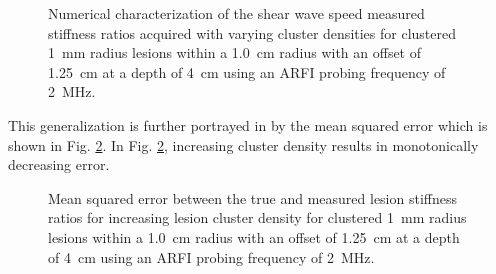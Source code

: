 			\begin{figure}[!htb]
				\centering
				\caption[Numerical characterization of shear wave speed measured stiffness ratio with clustered lesions]{Numerical characterization of the shear wave speed measured stiffness ratios acquired with varying cluster densities for clustered \SI{1}{\mm} radius lesions within a \SI{1.0}{cm} radius with an offset of \SI{1.25}{\cm} at a depth of \SI{4}{\cm} using an ARFI probing frequency of \SI{2}{\MHz}.}
				\label{fig:erel_cluster_density}
			\end{figure}

			This generalization is further portrayed in by the mean squared error which is shown in Fig. \ref{fig:erel_cluster_density_mse}. In Fig. \ref{fig:erel_cluster_density_mse}, increasing cluster density results in monotonically decreasing error.

			\begin{figure}[!htb]
				\centering
				\caption[Shear-wave speed quantified mean squared error related to small lesion cluster density]{Mean squared error between the true and measured lesion stiffness ratios for increasing lesion cluster density for clustered \SI{1}{\mm} radius lesions within a \SI{1.0}{cm} radius with an offset of \SI{1.25}{\cm} at a depth of \SI{4}{\cm} using an ARFI probing frequency of \SI{2}{\MHz}.}
				\label{fig:erel_cluster_density_mse}
			\end{figure}

